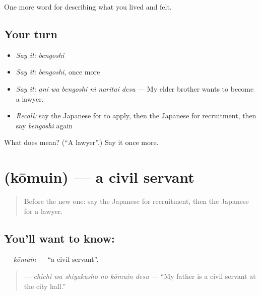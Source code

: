 \begin{grammarlens}[title={What you've built}]
One more word for describing what you lived and felt.
\end{grammarlens}

\subsection*{Your turn}
\begin{itemize}
\raggedright
  \item \emph{Say it:} \emph{bengoshi}
  \item \emph{Say it:} \emph{bengoshi}, once more
  \item \emph{Say it:} \emph{ani wa bengoshi ni naritai desu} — My elder brother wants to become a lawyer.
  \item \emph{Recall:} say the Japanese for to apply, then the Japanese for recruitment, then say \emph{bengoshi} again
\end{itemize}

\begin{tcolorbox}[breakable,colback=teal!4,colframe=teal!35!black,title={Before you move on}]
What does  mean? (\textquotedblleft{}A lawyer\textquotedblright{}.) Say it once more.
\end{tcolorbox}
\section[\texorpdfstring{\ja{こうむいん} (kōmuin)}{こうむいん (kōmuin)}]{ (kōmuin) — a civil servant}

\label{lesson:JA-C458-koumuin}



\begin{quote}
Before the new one: say the Japanese for recruitment, then the Japanese for a lawyer.
\end{quote}

\subsection*{You'll want to know: }
\textbf{} — \emph{kōmuin} — \textquotedblleft{}a civil servant\textquotedblright{}.

\begin{quote}
\textbf{  } — \emph{chichi wa shiyakusho no kōmuin desu} — \textquotedblleft{}My father is a civil servant at the city hall.\textquotedblright{}
\end{quote}

